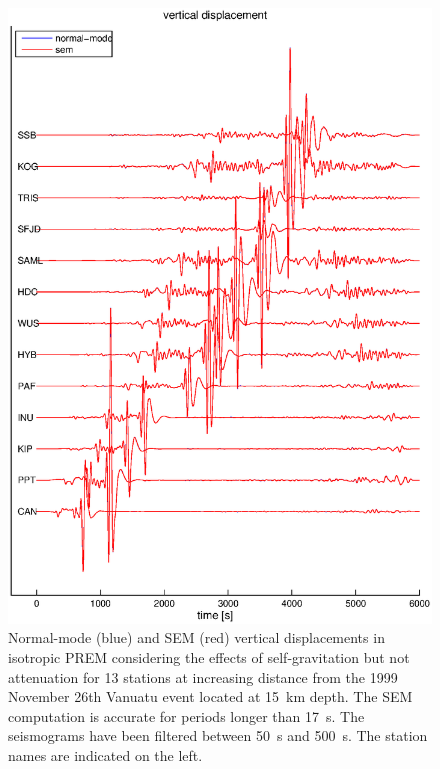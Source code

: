 \documentclass[oneside,english]{book}
\begin{document}
%
\begin{figure}[ht]
\noindent \begin{centering}
\includegraphics[scale=0.75]{figures/vanuatu_vertical.eps}\caption{\label{fig:Vanuatu-with-Vertical} Normal-mode (blue) and SEM (red)
vertical displacements in isotropic PREM considering the effects of
self-gravitation but not attenuation for 13 stations at increasing
distance from the 1999 November 26th Vanuatu event located at 15~km
depth. The SEM computation is accurate for periods longer than 17~s.
The seismograms have been filtered between 50~s and 500~s. The station
names are indicated on the left. }

\par\end{centering}
\end{figure}
%
\end{document}
